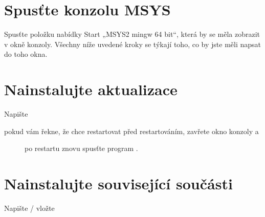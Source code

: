 \documentclass[letterpaper,10pt,czech]{sphinxmanual}
\begin{document}
\section{Spusťte konzolu MSYS}
\label{\detokenize{build-win32_cz:spustte-konzolu-msys}}
Spusťte položku nabídky Start „MSYS2 mingw 64 bit“, která by se měla zobrazit
v okně konzoly. Všechny níže uvedené kroky se týkají toho, co by jste měli napsat
do toho okna.


\section{Nainstalujte aktualizace}
\label{\detokenize{build-win32_cz:nainstalujte-aktualizace}}
Napište

\begin{sphinxVerbatim}[commandchars=\\\{\}]
 
\end{sphinxVerbatim}
\begin{description}
\item[{pokud vám řekne, že chce restartovat před restartováním, zavřete okno konzoly a}] \leavevmode
po restartu znovu spusťte program .

\end{description}


\section{Nainstalujte související součásti}
\label{\detokenize{build-win32_cz:nainstalujte-souvisejici-soucasti}}
Napište / vložte
\end{document}
